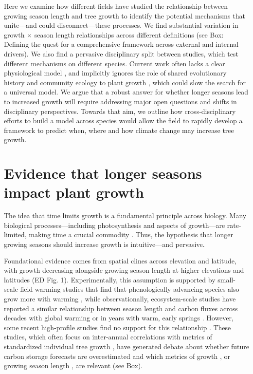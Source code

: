 \documentclass[11pt]{article}
\begin{document}
Here we examine how different fields have studied the relationship between growing season length and tree growth to identify the potential mechanisms that unite---and could disconnect---these processes. 
We find substantial variation in growth $\times$ season length relationships across different definitions (see Box: Defining the quest for a comprehensive framework across external and internal drivers). We also find a pervasive disciplinary split between studies, which test different mechanisms on different species. Current work often lacks a clear physiological model \citep{korner2015paradigm,fatichi2019modelling}, and implicitly ignores the role of shared evolutionary history and community ecology to plant growth \citep[e.g.][]{Grime:1977sw,Webb:2002or,avila2023evidence}, which could slow the search for a universal model. We argue that a robust answer for whether longer seasons lead to increased growth will require addressing major open questions and shifts in disciplinary perspectives. Towards that aim, we outline how cross-disciplinary efforts to build a model across species would allow the field to rapidly develop a framework to predict when, where and how climate change may increase tree growth. 

\section*{Evidence that longer seasons impact plant growth} %
The idea that time limits growth is a fundamental principle across biology. Many biological processes---including photosynthesis and aspects of growth---are rate-limited, making time a crucial commodity \citep{nobel1983biophysical,cosgrove2005growth,hilty2021plant}. Thus, the hypothesis that longer growing seasons should increase growth is intuitive---and pervasive. 

Foundational evidence comes from spatial clines across elevation and latitude, with growth decreasing alongside growing season length at higher elevations and latitudes (ED Fig. 1). Experimentally, this assumption is supported by small-scale field warming studies that find that phenologically advancing species also grow more with warming \citep[][]{Cleland:2012}, while observationally, ecosystem-scale studies have reported a similar relationship between season length and carbon fluxes across decades with global warming \citep{keenan2014net} or in years with warm, early springs \citep{chen1999effects}. However, some recent high-profile studies find no support for this relationship \citep{dow2022warm}. These studies, which often focus on inter-annual correlations with metrics of standardized individual tree growth \citep{dow2022warm,silvestro2023longer}, have generated debate about whether future carbon storage forecasts are overestimated and which metrics of growth \citep{green2022limits}, or growing season length \citep{korner2023four}, are relevant (see Box).
\end{document}
